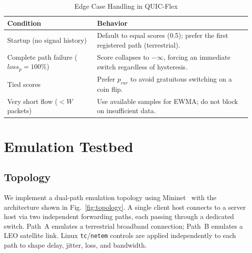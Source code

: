 \documentclass[conference,10pt]{IEEEtran}
\begin{document}
\begin{table}[htbp]
\caption{Edge Case Handling in QUIC-Flex}
\label{tab:edge_cases}
\centering
\begin{tabular}{@{}p{2.8cm}p{5cm}@{}}
\toprule
\textbf{Condition} & \textbf{Behavior} \\
\midrule
Startup (no signal history) & Default to equal scores (0.5); prefer the first registered path (terrestrial). \\
\midrule
Complete path failure ($loss_p = 100\%$) & Score collapses to $-\infty$, forcing an immediate switch regardless of hysteresis. \\
\midrule
Tied scores & Prefer $p_{cur}$ to avoid gratuitous switching on a coin flip. \\
\midrule
Very short flow ($< W$ packets) & Use available samples for EWMA; do not block on insufficient data. \\
\bottomrule
\end{tabular}
\end{table}

\section{Emulation Testbed}
\label{sec:testbed}

\subsection{Topology}

We implement a dual-path emulation topology using Mininet~\cite{lantz2025mininet} with the architecture shown in Fig.~\ref{fig:topology}.
A single client host connects to a server host via two independent forwarding paths, each passing through a dedicated switch.
Path~A emulates a terrestrial broadband connection; Path~B emulates a LEO satellite link.
Linux \texttt{tc}/\texttt{netem} controls are applied independently to each path to shape delay, jitter, loss, and bandwidth.
\end{document}
